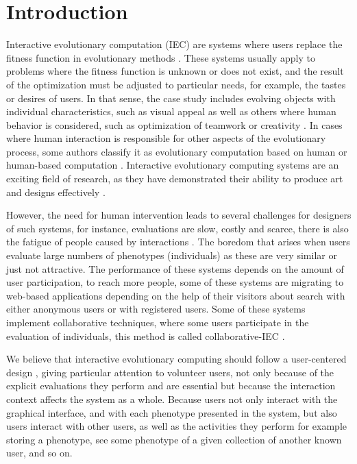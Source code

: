 \chapter{Introduction} \label{introduction}


\par Interactive evolutionary computation (IEC) are systems where users replace the
fitness function in evolutionary methods \cite{eiben2015introduction}. 
These systems usually apply to problems
where the fitness function is unknown or does not exist, and the result of the
optimization must be adjusted to particular needs, for example, the tastes or
desires of users. In that sense, the case study includes evolving objects
with individual characteristics, such as visual appeal as well as others where
human behavior is considered, such as optimization of teamwork
\cite{kosorukoff2002evolutionary} or creativity \cite{yu2011cooks}. In cases
where human interaction is   responsible for other aspects of the evolutionary
process, some authors classify it as evolutionary computation based on human
\cite{kosorukoff2001human} or human-based computation \cite{quinn2011human}.
Interactive evolutionary computing systems are an exciting field of research, as
they have demonstrated their ability to produce art and designs effectively
\cite{bentley1999introduction, kowaliw2012promoting, sims1991artificial,
todd1994evolutionary}.

\par However, the need for human intervention leads to several challenges for
designers of such systems, for instance, evaluations are slow, costly and
scarce, there is also the fatigue of people caused by interactions
\cite{takagi1998interactive}. The boredom that arises when users evaluate large
numbers of phenotypes (individuals) as these are very similar or just not attractive. The
performance of these systems depends on the amount of user participation, to
reach more people, some of these systems are migrating to web-based applications
depending on the help of their visitors about search with either anonymous users
or with registered users. Some of these systems implement collaborative
techniques, where some users participate in the evaluation of individuals, this
method is called collaborative-IEC \cite{secretan2008picbreeder,
seyama2016development, wagy2014collective}.

\par We believe that interactive evolutionary computing should follow a user-centered
design \cite{greenhouse2012human}, giving particular attention to volunteer
users, not only because of the explicit evaluations they perform and are
essential but because the interaction context affects the system as a whole.
Because users not only interact with the graphical interface, and with each
phenotype presented in the system, but also users interact with other users, as
well as the activities they perform for example storing a phenotype, see some
phenotype of a given collection of another known user, and so on.

